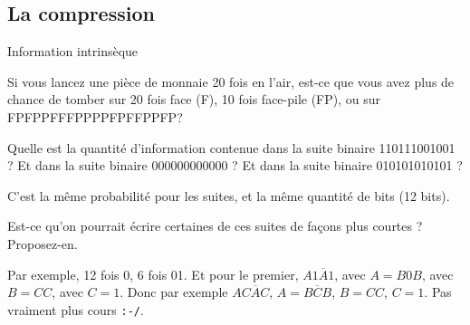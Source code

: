 \subsection{La compression}
\begin{exercice}
  \begin{exercicelet}{Information intrinsèque}
    \begin{questions}
    \item Si vous lancez une pièce de monnaie 20 fois en l'air, est-ce que
      vous avez plus de chance de tomber sur 20 fois face (F), 10 fois
      face-pile (FP), ou sur FPFPPFFFPPPPFPFFPPFP?
    \item Quelle est la quantité d'information contenue dans la suite binaire
      110111001001 ?  Et dans la suite binaire 000000000000 ? Et dans la suite
      binaire 010101010101 ?
      \begin{xcorrection}
        C'est la même probabilité pour les suites, et la même quantité de bits
        (12 bits).
      \end{xcorrection}
    \item Est-ce qu'on pourrait écrire certaines de ces suites de façons plus
      courtes ? Proposez-en.
      \begin{xcorrection}
        Par exemple, 12 fois 0, 6 fois 01. Et pour le premier,
        $A1\overline{A}1$, avec $A=B0B$, avec $B=CC$, avec $C=1$. Donc par
        exemple $AC\overline{A}C$, $A=B\overline{C}B$, $B=CC$, $C=1$. Pas
        vraiment plus cours \texttt{:-/}.
      \end{xcorrection}
    \end{questions}
  \end{exercicelet}
\end{exercice}
